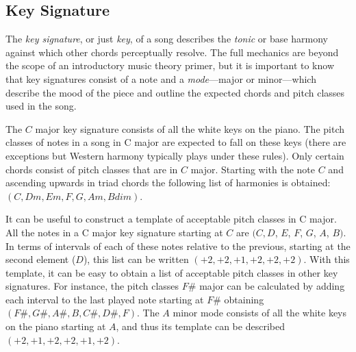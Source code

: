 \subsection{Key Signature}

The \textit{key signature}, or just \textit{key}, of a song describes the \textit{tonic} or base harmony against which other chords perceptually resolve. The full mechanics are beyond the scope of an introductory music theory primer, but it is important to know that key signatures consist of a note and a \textit{mode}---major or minor---which describe the mood of the piece and outline the expected chords and pitch classes used in the song.

The $C$ major key signature consists of all the white keys on the piano. The pitch classes of notes in a song in C major are expected to fall on these keys (there are exceptions but Western harmony typically plays under these rules). Only certain chords consist of pitch classes that are in $C$ major. Starting with the note $C$ and ascending upwards in triad chords the following list of harmonies is obtained: $(C, Dm, Em, F, G, Am, Bdim)$.

It can be useful to construct a template of acceptable pitch classes in C major. All the notes in a C major key signature starting at $C$ are $(C, D$, $E$, $F$, $G$, $A$, $B)$. In terms of intervals of each of these notes relative to the previous, starting at the second element ($D$), this list can be written $(+2, +2, +1, +2, +2, +2)$. With this template, it can be easy to obtain a list of acceptable pitch classes in other key signatures. For instance, the pitch classes $F\#$ major can be calculated by adding each interval to the last played note starting at $F\#$ obtaining $(F\#,G\#,A\#,B,C\#,D\#,F)$. The $A$ minor mode consists of all the white keys on the piano starting at $A$, and thus its template can be described $(+2,+1,+2,+2,+1,+2)$.

